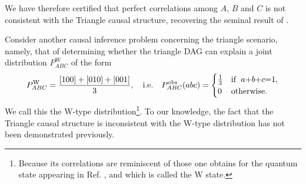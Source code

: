 We have therefore certified that perfect correlations among $A$, $B$ and $C$ is not consistent with the Triangle causal structure, recovering the seminal result of \citet{steudel2010ancestors}.

\par\smallskip\nobreak

Consider another causal inference problem concerning the triangle scenario, namely, that of determining whether the triangle DAG can explain a joint distribution $P^{\text{W}}_{A B C}$ of the form
\begin{align}\label{eq:wdistribution1}
P^{\text{W}}_{A B C}=\frac{[100]+[010]+[001]}{3},\quad\text{i.e.}\quad P^{\text{obs}}_{A B C}(a b c)=\begin{cases}\tfrac{1}{3}&\text{if }\; a\mathord{+}b\mathord{+}c\mathord{=} 1, \\ 0&\text{otherwise}.\end{cases}
\end{align}
We call this the W-type distribution\footnote{Because its correlations are reminiscent of those one obtains for the quantum state appearing in Ref. \cite{3Qubits2Ways}, and which is called the W state.}. To our knowledge, the fact that the Triangle causal structure is inconsistent with the W-type distribution has not been demonstrated previously.

